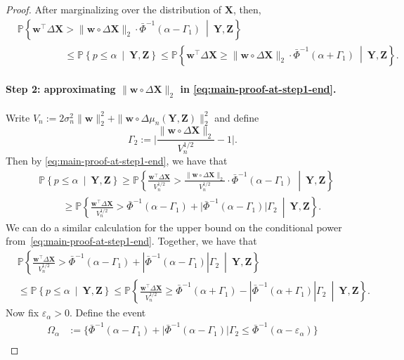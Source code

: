 \documentclass[12pt]{article}
\newcommand{\PPst}[2]{\mathbb{P}\left\{{#1}\  \middle| \ {#2}\right\}}
\newcommand{\bX}{\mathbf{X}}
\newcommand{\bY}{\mathbf{Y}}
\newcommand{\bZ}{\mathbf{Z}}
\newcommand{\bw}{\mathbf{w}}
\begin{document}
\begin{proof}
        After marginalizing over the distribution of $\bX$, then,
        \begin{align} \label{eq:main-proof-at-step1-end}
    &\PPst{\bw^\top \Delta\bX > \|\bw\circ \Delta\bX\|_2\cdot \bar\Phi^{-1}(\alpha - \Gamma_1)}{\bY,\bZ} \nonumber \\
    &\hspace{2cm}\leq \PPst{p\leq \alpha}{\bY,\bZ}\leq \PPst{\bw^\top \Delta\bX \geq \|\bw\circ \Delta\bX\|_2\cdot \bar\Phi^{-1}(\alpha + \Gamma_1)}{\bY,\bZ}.
    \end{align}

    \paragraph{Step 2: approximating $\|\bw\circ \Delta\bX\|_2$ in \eqref{eq:main-proof-at-step1-end}.}
    Write $V_n := 2\sigma_n^2\|\bw\|^2_2 + \|\bw\circ\Delta\mu_n(\bY,\bZ)\|^2_2$ and define
    \[
    \Gamma_2 :=\biggl|\frac{\|\bw\circ\Delta\bX\|_2}{V_n^{1/2}} - 1\biggr|.
    \]
    Then by \eqref{eq:main-proof-at-step1-end}, we have that
    \begin{align*}
        &\PPst{p\leq \alpha}{\bY,\bZ} \geq \PPst{\frac{\bw^\top \Delta\bX}{V_n^{1/2}} > \frac{\|\bw\circ \Delta\bX\|_2}{V_n^{1/2}}\cdot \bar\Phi^{-1}(\alpha - \Gamma_1)}{\bY,\bZ}\\
       &\hspace{1cm}\geq\PPst{\frac{\bw^\top \Delta\bX}{V_n^{1/2} } > \bar\Phi^{-1}(\alpha - \Gamma_1)+\bigl|\bar\Phi^{-1}(\alpha - \Gamma_1)\bigr|\Gamma_2}{\bY,\bZ}.
    \end{align*}
    We can do a similar calculation for the upper bound on the conditional power from~\eqref{eq:main-proof-at-step1-end}. Together, we have that
    \begin{align*}
        &\PPst{\frac{\bw^\top \Delta\bX}{V_n^{1/2} } > \bar\Phi^{-1}(\alpha - \Gamma_1)+\left|\bar\Phi^{-1}(\alpha - \Gamma_1)\right|\Gamma_2}{\bY,\bZ}\\
        &\leq \PPst{p\leq \alpha}{\bY,\bZ}\leq \PPst{\frac{\bw^\top \Delta\bX}{V_n^{1/2} } \geq \bar\Phi^{-1}(\alpha + \Gamma_1) -\left|\bar\Phi^{-1}(\alpha + \Gamma_1)\right|\Gamma_2}{\bY,\bZ}.
    \end{align*}
    Now fix $\varepsilon_\alpha>0$. Define the event 
    \begin{align}\label{eqn:alpha_Delta_event}
    \Omega_\alpha &:= \bigl\{\bar\Phi^{-1}(\alpha - \Gamma_1)+\bigl|\bar\Phi^{-1}(\alpha - \Gamma_1)\bigr|\Gamma_2 \leq \bar\Phi^{-1}( \alpha - \varepsilon_\alpha)\bigr\} \nonumber \\ 

\end{align}
\end{proof}
\end{document}
